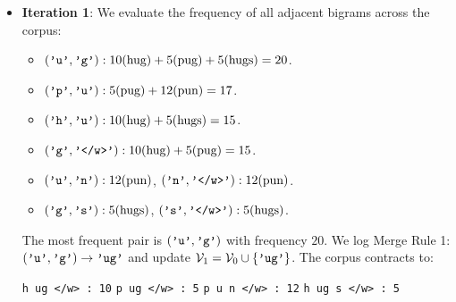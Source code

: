 \documentclass[../../main.tex]{subfiles}
\begin{document}
\begin{itemize}
    \item \textbf{Iteration 1}: We evaluate the frequency of all adjacent bigrams across the corpus:
    \begin{itemize}
        \item $(\text{\texttt{'u'}}, \text{\texttt{'g'}}): 10 (\text{hug}) + 5 (\text{pug}) + 5 (\text{hugs}) = 20$.
        \item $(\text{\texttt{'p'}}, \text{\texttt{'u'}}): 5 (\text{pug}) + 12 (\text{pun}) = 17$.
        \item $(\text{\texttt{'h'}}, \text{\texttt{'u'}}): 10 (\text{hug}) + 5 (\text{hugs}) = 15$.
        \item $(\text{\texttt{'g'}}, \text{\texttt{'</w>'}}): 10 (\text{hug}) + 5 (\text{pug}) = 15$.
        \item $(\text{\texttt{'u'}}, \text{\texttt{'n'}}): 12 (\text{pun})$, \quad $(\text{\texttt{'n'}}, \text{\texttt{'</w>'}}): 12 (\text{pun})$.
        \item $(\text{\texttt{'g'}}, \text{\texttt{'s'}}): 5 (\text{hugs})$, \quad $(\text{\texttt{'s'}}, \text{\texttt{'</w>'}}): 5 (\text{hugs})$.
    \end{itemize}
    The most frequent pair is $(\text{\texttt{'u'}}, \text{\texttt{'g'}})$ with frequency $20$.
    We log Merge Rule 1: $(\text{\texttt{'u'}}, \text{\texttt{'g'}}) \to \text{\texttt{'ug'}}$ and update $\mathcal{V}_1 = \mathcal{V}_0 \cup \{\text{\texttt{'ug'}}\}$.
    The corpus contracts to:
    \begin{center}
    \texttt{h ug </w> : 10} \qquad \texttt{p ug </w> : 5} \qquad \texttt{p u n </w> : 12} \qquad \texttt{h ug s </w> : 5}
    \end{center}


\end{itemize}
\end{document}
